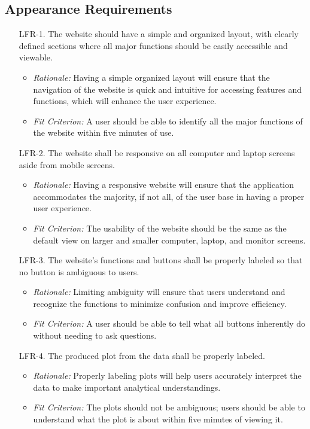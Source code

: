\documentclass[12pt]{article}
\begin{document}
\subsection{Appearance Requirements}
\begin{enumerate}
  \item[LFR-1.] The website should have a simple and organized layout, with
  clearly defined sections where all major functions should be easily accessible
  and viewable.
  \begin{itemize}
    \item \textit{Rationale:} Having a simple organized layout will ensure that the
    navigation of the website is quick and intuitive for accessing features and
    functions, which will enhance the user experience.
    \item \textit{Fit Criterion:} A user should be able to identify all the major
    functions of the website within five minutes of use.
  \end{itemize}
  
  \item[LFR-2.] The website shall be responsive on all computer and laptop screens
  aside from mobile screens.
  \begin{itemize}
    \item \textit{Rationale:} Having a responsive website will ensure that the
    application accommodates the majority, if not all, of the user base in having a
    proper user experience. 
    \item \textit{Fit Criterion:} The usability of the website should be the same
    as the default view on larger and smaller computer, laptop, and monitor screens.
  \end{itemize}
  
  \item[LFR-3.] The website's functions and buttons shall be properly labeled
  so that no button is ambiguous to users.
  \begin{itemize}
    \item \textit{Rationale:} Limiting ambiguity will ensure that users
    understand and recognize the functions to minimize confusion and improve
    efficiency.
    \item \textit{Fit Criterion:} A user should be able to tell what all buttons
    inherently do without needing to ask questions.
  \end{itemize}
  
  \item[LFR-4.] The produced plot from the data shall be properly labeled.
  \begin{itemize}
    \item \textit{Rationale:} Properly labeling plots will help users
    accurately interpret the data to make important analytical understandings.
    \item \textit{Fit Criterion:} The plots should not be ambiguous; users
    should be able to understand what the plot is about within five minutes of
    viewing it.
  \end{itemize}
\end{enumerate}
\end{document}
